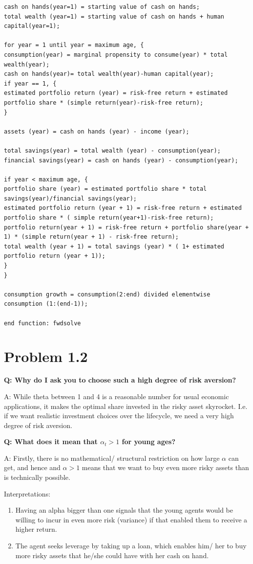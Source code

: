 \documentclass[12pt,a4paper]{article}
\begin{document}
\begin{lstlisting}[frame=single]
cash on hands(year=1) = starting value of cash on hands;
total wealth (year=1) = starting value of cash on hands + human capital(year=1);

for year = 1 until year = maximum age, {
consumption(year) = marginal propensity to consume(year) * total wealth(year);
cash on hands(year)= total wealth(year)-human capital(year);
if year == 1, {
estimated portfolio return (year) = risk-free return + estimated portfolio share * (simple return(year)-risk-free return);
}

assets (year) = cash on hands (year) - income (year);

total savings(year) = total wealth (year) - consumption(year);
financial savings(year) = cash on hands (year) - consumption(year);

if year < maximum age, {
portfolio share (year) = estimated portfolio share * total savings(year)/financial savings(year);
estimated portfolio return (year + 1) = risk-free return + estimated portfolio share * ( simple return(year+1)-risk-free return);
portfolio return(year + 1) = risk-free return + portfolio share(year + 1) * (simple return(year + 1) - risk-free return);
total wealth (year + 1) = total savings (year) * ( 1+ estimated portfolio return (year + 1));
}
}

consumption growth = consumption(2:end) divided elementwise consumption (1:(end-1));

end function: fwdsolve
\end{lstlisting}

\section*{Problem 1.2}

\textbf{Q: Why do I ask you to choose such a high degree of risk aversion?}

A: While theta between 1 and 4 is a reasonable number for usual economic applications, it makes the optimal share invested in the risky asset skyrocket. I.e. if we want realistic investment choices over the lifecycle, we need a very high degree of risk aversion.

\textbf{Q: What does it mean that $\alpha_t > 1$ for young ages? }

A: Firstly, there is no mathematical/ structural restriction on how large $\alpha$ can get, and hence and $\alpha >1$ means that we want to buy even more risky assets than is technically possible.

Interpretations:
\vspace{-1em}
\begin{enumerate}
  \item Having an alpha bigger than one signals that the young agents would be willing to incur in even more risk (variance) if that enabled them to receive a higher return.
  \item The agent seeks leverage by taking up a loan, which enables him/ her to buy more risky assets that he/she could have with her cash on hand.
\end{enumerate}
\end{document}
